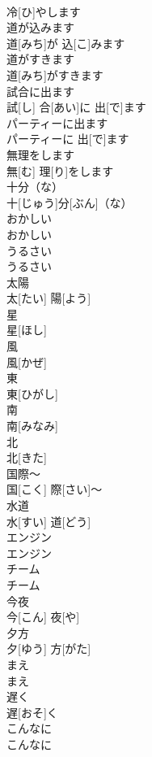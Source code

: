\documentclass[8pt]{extreport}
\begin{document}
\begin{CJK}{UTF8}{min}
\\	冷[ひ]やします		
\\	道が込みます	
\\	道[みち]が 込[こ]みます		
\\	道がすきます	
\\	道[みち]がすきます		
\\	試合に出ます	
\\	試[し] 合[あい]に 出[で]ます		
\\	パーティーに出ます	
\\	パーティーに 出[で]ます		
\\	無理をします	
\\	無[む] 理[り]をします		
\\	十分（な）	
\\	十[じゅう]分[ぶん]（な）		
\\	おかしい	
\\	おかしい		
\\	うるさい	
\\	うるさい		
\\	太陽	
\\	太[たい] 陽[よう]		
\\	星	
\\	星[ほし]		
\\	風	
\\	風[かぜ]		
\\	東	
\\	東[ひがし]		
\\	南	
\\	南[みなみ]		
\\	北	
\\	北[きた]		
\\	国際～	
\\	国[こく] 際[さい]～		
\\	水道	
\\	水[すい] 道[どう]		
\\	エンジン	
\\	エンジン		
\\	チーム	
\\	チーム		
\\	今夜	
\\	今[こん] 夜[や]		
\\	夕方	
\\	夕[ゆう] 方[がた]		
\\	まえ	
\\	まえ		
\\	遅く	
\\	遅[おそ]く		
\\	こんなに	
\\	こんなに		

\end{CJK}
\end{document}
